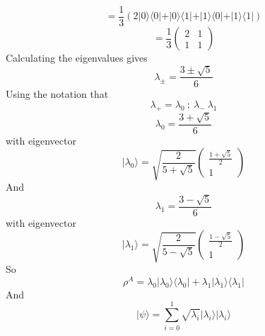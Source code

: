 \documentclass[12pt]{article}
\newcommand{\ket}[1]{\vert{#1}\rangle}
\newcommand{\bra}[1]{\langle{#1}\vert}
\begin{document}
\begin{enumerate}
\begin{enumerate}
    $$ = \frac{1}{3} (2 \ket{0}\bra{0} + \ket{0} \bra{1} + \ket{1}\bra{0} + \ket{1}\bra{1})$$
    $$ = \frac{1}{3} \left(\begin{array}{cc} 2 & 1 \\ 1 & 1\end{array}\right)$$
    Calculating the eigenvalues gives
    $$ \lambda_{\pm} = \frac{3 \pm \sqrt{5}}{6} $$
    Using the notation that 
    $$ \lambda_+ = \lambda_0 \ ; \ \lambda_- \ \lambda_1 $$ 
    $$ \lambda_0 = \frac{3 + \sqrt{5}}{6} $$
    with eigenvector 
    $$ \ket{\lambda_0} = \sqrt{\frac{2}{5 + \sqrt{5}}} \left(\begin{array}{cc} \frac{1+\sqrt{5}}{2} \\ 1\end{array}\right)$$
    And 
    $$ \lambda_1 = \frac{3 - \sqrt{5}}{6} $$
    with eigenvector 
    $$ \ket{\lambda_1} = \sqrt{\frac{2}{5 - \sqrt{5}}} \left(\begin{array}{cc} \frac{1-\sqrt{5}}{2} \\ 1\end{array}\right)$$
    So 
    $$\rho^A = \lambda_0 \ket{\lambda_0} \bra{\lambda_0} + \lambda_1 \ket{\lambda_1}\bra{\lambda_1} $$
    And 
    $$ \ket{\psi} = \sum_{i=0}^1 \sqrt{\lambda_i} \ket{\lambda_i}\ket{\lambda_i} $$
\end{enumerate}


\end{enumerate}
\end{document}
